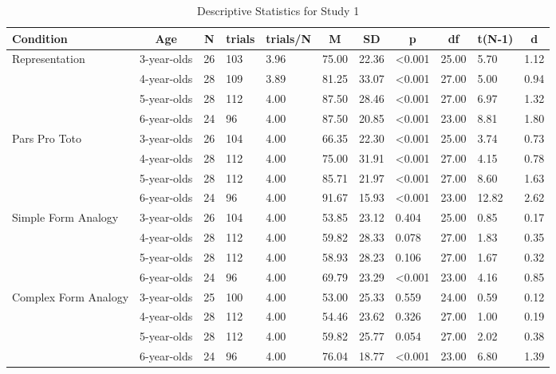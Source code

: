 \documentclass[
  man]{apa6}
\begin{document}
\begin{table}[tbp]

\begin{center}
\begin{threeparttable}

\caption{\label{tab:s1_testtables}Descriptive Statistics for Study 1}

\scriptsize{

\begin{tabular}{lllllllllll}
\toprule
Condition & \multicolumn{1}{c}{Age} & \multicolumn{1}{c}{N} & \multicolumn{1}{c}{trials} & \multicolumn{1}{c}{trials/N} & \multicolumn{1}{c}{M} & \multicolumn{1}{c}{SD} & \multicolumn{1}{c}{p} & \multicolumn{1}{c}{df} & \multicolumn{1}{c}{t(N-1)} & \multicolumn{1}{c}{d}\\
\midrule
Representation & 3-year-olds & 26 & 103 & 3.96 & 75.00 & 22.36 & <0.001 & 25.00 & 5.70 & 1.12\\
 & 4-year-olds & 28 & 109 & 3.89 & 81.25 & 33.07 & <0.001 & 27.00 & 5.00 & 0.94\\
 & 5-year-olds & 28 & 112 & 4.00 & 87.50 & 28.46 & <0.001 & 27.00 & 6.97 & 1.32\\
 & 6-year-olds & 24 & 96 & 4.00 & 87.50 & 20.85 & <0.001 & 23.00 & 8.81 & 1.80\\
Pars Pro Toto & 3-year-olds & 26 & 104 & 4.00 & 66.35 & 22.30 & <0.001 & 25.00 & 3.74 & 0.73\\
 & 4-year-olds & 28 & 112 & 4.00 & 75.00 & 31.91 & <0.001 & 27.00 & 4.15 & 0.78\\
 & 5-year-olds & 28 & 112 & 4.00 & 85.71 & 21.97 & <0.001 & 27.00 & 8.60 & 1.63\\
 & 6-year-olds & 24 & 96 & 4.00 & 91.67 & 15.93 & <0.001 & 23.00 & 12.82 & 2.62\\
Simple Form Analogy & 3-year-olds & 26 & 104 & 4.00 & 53.85 & 23.12 & 0.404 & 25.00 & 0.85 & 0.17\\
 & 4-year-olds & 28 & 112 & 4.00 & 59.82 & 28.33 & 0.078 & 27.00 & 1.83 & 0.35\\
 & 5-year-olds & 28 & 112 & 4.00 & 58.93 & 28.23 & 0.106 & 27.00 & 1.67 & 0.32\\
 & 6-year-olds & 24 & 96 & 4.00 & 69.79 & 23.29 & <0.001 & 23.00 & 4.16 & 0.85\\
Complex Form Analogy & 3-year-olds & 25 & 100 & 4.00 & 53.00 & 25.33 & 0.559 & 24.00 & 0.59 & 0.12\\
 & 4-year-olds & 28 & 112 & 4.00 & 54.46 & 23.62 & 0.326 & 27.00 & 1.00 & 0.19\\
 & 5-year-olds & 28 & 112 & 4.00 & 59.82 & 25.77 & 0.054 & 27.00 & 2.02 & 0.38\\
 & 6-year-olds & 24 & 96 & 4.00 & 76.04 & 18.77 & <0.001 & 23.00 & 6.80 & 1.39\\
\bottomrule
\end{tabular}

}

\end{threeparttable}
\end{center}

\end{table}
\end{document}
